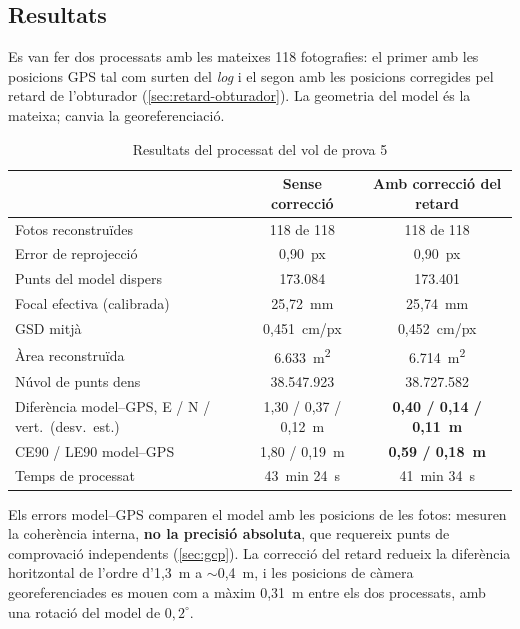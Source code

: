 \subsection{Resultats}

Es van fer dos processats amb les mateixes 118 fotografies: el primer amb les posicions GPS tal com surten del \emph{log} i el segon amb les posicions corregides pel retard de l'obturador (\cref{sec:retard-obturador}). La geometria del model és la mateixa; canvia la georeferenciació.

\begin{table}[H]
    \centering
    \caption{Resultats del processat del vol de prova 5}
    \label{tab:vol5-resultats}
    \small
    \begin{tabular}{lcc}
        \toprule
        & Sense correcció & Amb correcció del retard \\
        \midrule
        Fotos reconstruïdes & 118 de 118 & 118 de 118 \\
        Error de reprojecció & 0,90~px & 0,90~px \\
        Punts del model dispers & 173.084 & 173.401 \\
        Focal efectiva (calibrada) & 25,72~mm & 25,74~mm \\
        GSD mitjà & 0,451~cm/px & 0,452~cm/px \\
        Àrea reconstruïda & 6.633~m\textsuperscript{2} & 6.714~m\textsuperscript{2} \\
        Núvol de punts dens & 38.547.923 & 38.727.582 \\
        Diferència model--GPS, E / N / vert.\ (desv.\ est.) & 1,30 / 0,37 / 0,12~m & \textbf{0,40 / 0,14 / 0,11~m} \\
        CE90 / LE90 model--GPS & 1,80 / 0,19~m & \textbf{0,59 / 0,18~m} \\
        Temps de processat & 43~min 24~s & 41~min 34~s \\
        \bottomrule
    \end{tabular}
\end{table}

Els errors model--GPS comparen el model amb les posicions de les fotos: mesuren la coherència interna, \textbf{no la precisió absoluta}, que requereix punts de comprovació independents (\cref{sec:gcp}). La correcció del retard redueix la diferència horitzontal de l'ordre d'1,3~m a $\sim$0,4~m, i les posicions de càmera georeferenciades es mouen com a màxim 0,31~m entre els dos processats, amb una rotació del model de $0{,}2^{\circ}$.

